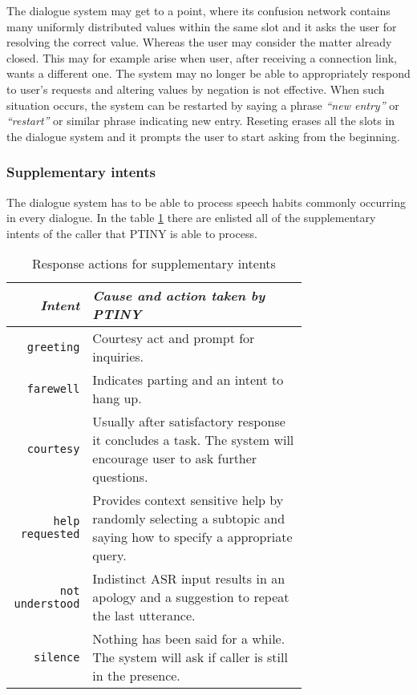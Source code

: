 The dialogue system may get to a point, where its confusion network contains many uniformly distributed values within the same slot and it asks the user for resolving the correct value.
Whereas the user may consider the matter already closed.
This may for example arise when user, after receiving a connection link, wants a different one.
The system may no longer be able to appropriately respond to user's requests and altering values by negation is not effective.
When such situation occurs, the system can be restarted by saying a phrase \textit{``new entry''} or \textit{``restart''} or similar phrase indicating new entry.
Reseting erases all the slots in the dialogue system and it prompts the user to start asking from the beginning.

\newpage

\subsubsection{Supplementary intents} %

The dialogue system has to be able to process speech habits commonly occurring in every dialogue.
In the table \ref{table:sup} there are enlisted all of the supplementary intents of the caller that PTINY is able to process.

\begin{table}[h]
\centering
\begin{tabular}{ r | p{0.73\linewidth} }
	\textit{Intent} & \textit{Cause and action taken by PTINY} \\ \hline
	\texttt{greeting} & Courtesy act and prompt for inquiries.\\
	\texttt{farewell} & Indicates parting and an intent to hang up.\\
	\texttt{courtesy} & Usually after satisfactory response it concludes a task. The system will encourage user to ask further questions. \\
	\texttt{help requested} & Provides context sensitive help by randomly selecting a subtopic and saying how to specify a appropriate query. \\
	\texttt{not understood} & Indistinct ASR input results in an apology and a suggestion to repeat the last utterance.\\ %
	\texttt{silence} & Nothing has been said for a while. The system will ask if caller is still in the presence. %
\end{tabular}
\caption[Response actions for supplementary intents]{Response actions for supplementary intents}
\label{table:sup}
\end{table}

